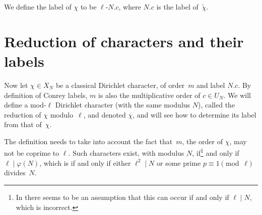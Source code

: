 \documentclass[a4paper, 10pt]{amsart}
\newcommand{\CLab}[2]{$#1.#2$}
\newcommand{\DLab}[3]{$#1$-$#2.#3$}
\begin{document}
We define the label of $\chi$ to be \DLab{\ell}{N}{c}, where
\CLab{N}{c} is the label of~$\tilde{\chi}$.

\section{Reduction of characters and their labels}

Now let $\chi\in X_N$ be a classical Dirichlet character, of
order~$m$ and label \CLab{N}{c}.  By definition of Conrey labels, $m$
is also the multiplicative order of $c\in U_N$.  We will define a
mod-$\ell$ Dirichlet character (with the same modulus $N$), called the
reduction of $\chi$ modulo~$\ell$, and denoted $\overline{\chi}$, and
will see how to determine its label from that of~$\chi$.

The definition needs to take into account the fact that~$m$, the order
of $\chi$, may not be coprime to $\ell$.  Such characters exist, with
modulus $N$, if\footnote{In \cite{OldDef} there seems to be an
  assumption that this can occur if and only if $\ell\mid N$, which is
  incorrect.} and only if $\ell\mid\varphi(N)$, which is if and only
if either $\ell^2\mid N$ or some prime $p\equiv1\pmod{\ell}$
divides~$N$.
\end{document}
